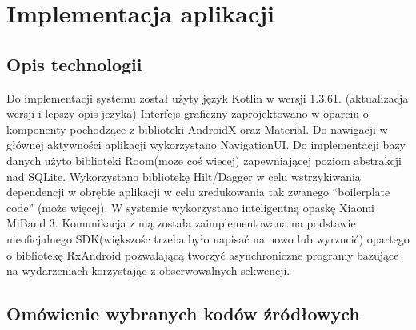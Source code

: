 \chapter{Implementacja aplikacji}
\thispagestyle{chapterBeginStyle}
\label{rozdzial3}

\section{Opis technologii}

Do implementacji systemu został użyty język Kotlin w wersji 1.3.61. (aktualizacja wersji i lepszy opis jezyka) Interfejs graficzny zaprojektowano w oparciu o komponenty pochodzące z biblioteki AndroidX oraz Material. Do nawigacji w głównej aktywności aplikacji wykorzystano NavigationUI. Do implementacji bazy danych użyto biblioteki Room(moze coś wiecej) zapewniającej poziom abstrakcji nad SQLite. Wykorzystano bibliotekę Hilt/Dagger w celu wstrzykiwania dependencji w obrębie aplikacji w celu zredukowania tak zwanego ``boilerplate code'' (może więcej).
\newline\newline
W systemie wykorzystano inteligentną opaskę Xiaomi MiBand 3. Komunikacja z nią została zaimplementowana na podstawie nieoficjalnego SDK(większośc trzeba było napisać na nowo lub wyrzucić) opartego o bibliotekę
RxAndroid pozwalającą tworzyć asynchroniczne programy bazujące na wydarzeniach korzystając z obserwowalnych sekwencji.


\section{Omówienie wybranych kodów źródłowych}

